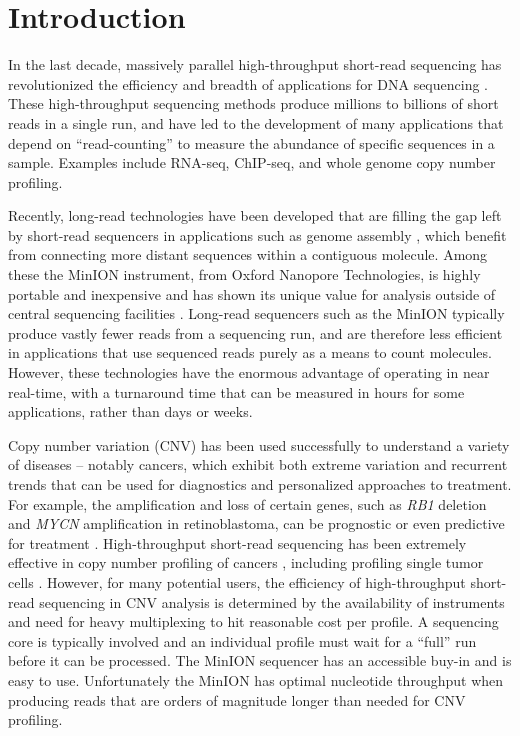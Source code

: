 \chapter{Introduction}
\label{ch1}

In the last decade, massively parallel high-throughput short-read
sequencing has revolutionized the efficiency and breadth of applications
for DNA sequencing \citep{kircher2010high}.  These high-throughput
sequencing methods produce millions to billions of short reads in a
single run, and have led to the development of many applications that
depend on ``read-counting'' to measure the abundance of specific
sequences in a sample. Examples include RNA-seq, ChIP-seq, and whole
genome copy number profiling.

Recently, long-read technologies have been developed that are filling
the gap left by short-read sequencers in applications such as genome
assembly \citep{jain2018nanopore,loman2015complete}, which benefit from
connecting more distant sequences within a contiguous molecule. Among
these the MinION instrument, from Oxford Nanopore Technologies, is
highly portable and inexpensive and has shown its unique value for
analysis outside of central sequencing facilities \citep{quick2016real}.
Long-read sequencers such as the MinION typically produce vastly fewer
reads from a sequencing run, and are therefore less efficient in
applications that use sequenced reads purely as a means to count
molecules. However, these technologies have the enormous advantage of
operating in near real-time, with a turnaround time that can be measured
in hours for some applications, rather than days or weeks.

Copy number variation (CNV) has been used successfully to understand a
variety of diseases \citep{sebat2007strong} -- notably cancers, which
exhibit both extreme variation and recurrent trends that can be used for
diagnostics and personalized approaches to treatment. For example, the
amplification and loss of certain genes, such as \textit{RB1} deletion and
\textit{MYCN} amplification in retinoblastoma, can be prognostic or even
predictive for treatment \citep{berry2017potential}.  High-throughput short-read
sequencing has been extremely effective in copy number profiling of
cancers \citep{chiang2009high}, including profiling single tumor cells
\citep{navin2011tumour}. However, for many potential users, the
efficiency of high-throughput short-read sequencing in CNV analysis is
determined by the availability of instruments and need for heavy
multiplexing to hit reasonable cost per profile. A sequencing core is
typically involved and an individual profile must wait for a ``full''
run before it can be processed. The MinION sequencer has an accessible
buy-in and is easy to use. Unfortunately the MinION has optimal
nucleotide throughput when producing reads that are orders of magnitude
longer than needed for CNV profiling.

